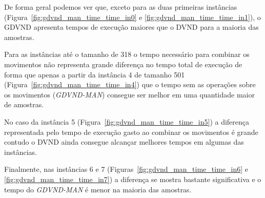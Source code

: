 

De forma geral podemos ver que, exceto para as duas primeiras instâncias (Figura~\ref{fig:gdvnd_man_time_time_in0} e \ref{fig:gdvnd_man_time_time_in1}), o GDVND apresenta tempos de execução maiores que o DVND para a maioria das amostras.



Para as instâncias até o tamanho de 318 o tempo necessário para combinar os movimentos não representa grande diferença no tempo total de execução de forma que apenas a partir da instância 4 de tamanho 501 (Figura~\ref{fig:gdvnd_man_time_time_in4}) que o tempo sem as operações sobre os movimentos (\textit{GDVND-MAN}) consegue ser melhor em uma quantidade maior de amostras.



No caso da instância 5 (Figura~\ref{fig:gdvnd_man_time_time_in5}) a diferença representada pelo tempo de execução gasto ao combinar os movimentos é grande contudo o DVND ainda consegue alcançar melhores tempos em algumas das instâncias.



Finalmente, nas instâncias 6 e 7 (Figuras~\ref{fig:gdvnd_man_time_time_in6} e \ref{fig:gdvnd_man_time_time_in7}) a diferença se mostra bastante significativa e o tempo do \textit{GDVND-MAN} é menor na maioria das amostras.

